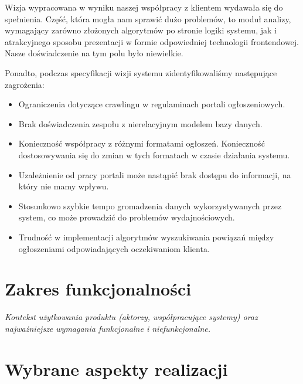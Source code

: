 \documentclass[polish,12pt]{aghthesis}
\begin{document}
Wizja wypracowana w wyniku naszej współpracy z klientem wydawała się do spełnienia.
Część, która mogła nam sprawić dużo problemów, to moduł analizy, wymagający
zarówno złożonych algorytmów po stronie logiki systemu, jak i atrakcyjnego
sposobu prezentacji w formie odpowiedniej technologii frontendowej. Nasze 
doświadczenie na tym polu było niewielkie.

Ponadto, podczas specyfikacji wizji systemu zidentyfikowaliśmy następujące zagrożenia:
\begin{itemize}

\item Ograniczenia dotyczące crawlingu w regulaminach portali ogłoszeniowych.
\item Brak doświadczenia zespołu z nierelacyjnym modelem bazy danych.
\item Konieczność współpracy z różnymi formatami ogłoszeń. Konieczność dostosowywania się do zmian w tych formatach w czasie działania systemu.
\item Uzależnienie od pracy portali może nastąpić brak dostępu do informacji, na który nie mamy wpływu.
\item Stosunkowo szybkie tempo gromadzenia danych wykorzystywanych przez system, co może prowadzić do problemów wydajnościowych.
\item Trudność w implementacji algorytmów wyszukiwania powiązań między ogłoszeniami odpowiadających oczekiwaniom klienta.
\end{itemize}

\section{Zakres funkcjonalności}
\label{sec:zakres-funkcjonalnosci}

\emph{Kontekst użytkowania produktu (aktorzy, współpracujące systemy)
  oraz najważniejsze wymagania funkcjonalne i niefunkcjonalne.}

\section{Wybrane aspekty realizacji}
\label{sec:wybrane-aspekty-realizacji}
\end{document}
